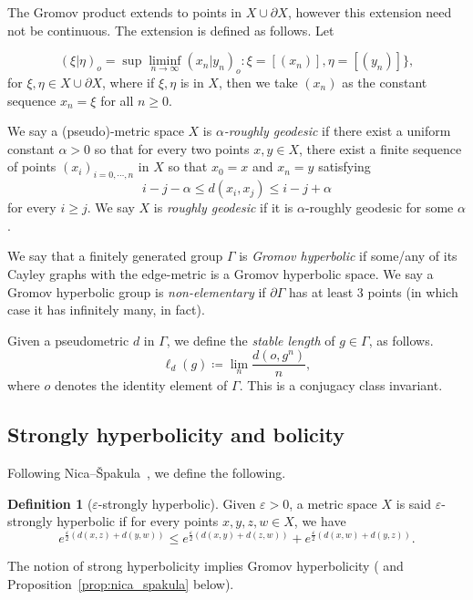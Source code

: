 \documentclass[12pt]{amsart}
\numberwithin{equation}{section}
\numberwithin{figure}{section}
\theoremstyle{definition}
\newtheorem{definition}[equation]{Definition}
\theoremstyle{plain}
\renewcommand{\epsilon}{\varepsilon}
\begin{document}
The Gromov product extends to points in $X \cup \partial X$, however this extension need not be continuous. The extension is defined as follows. Let

\[
(\xi | \eta)_o = \sup \liminf_{n \to \infty} (x_n | y_n)_o \colon \xi = [(x_n)], \eta = [(y_n)]\},
\]
for $\xi, \eta \in X \cup \partial X$, where if $\xi, \eta$ is in $X$, then we take $(x_n)$ as the constant sequence $x_n = \xi$ for all $n \geq 0$.

We say a (pseudo)-metric space $X$ is \emph{$\alpha$-roughly geodesic} if there exist a uniform constant $\alpha>0$ so that for every two points $x,y \in X$, there exist a finite sequence of points $(x_i)_{i=0,\cdots,n}$ in $X$ so that $x_0=x$ and $x_n=y$ satisfying
\[
i-j - \alpha \leq d(x_i,x_j) \leq i-j + \alpha
\]
for every $i \geq j$.
We say $X$ is \emph{roughly geodesic} if it is $\alpha$-roughly geodesic for some $\alpha$.

We say that a finitely generated group $\Gamma$ is \emph{Gromov hyperbolic} if some/any of its Cayley graphs with the edge-metric is a Gromov hyperbolic space.
We say a Gromov hyperbolic group is \emph{non-elementary} if $\partial \Gamma$ has at least 3 points (in which case it has infinitely many, in fact).

Given a pseudometric $d$ in $\Gamma$, we define the \emph{stable length} of $g \in \Gamma$, as follows.
\[
\ell_d(g) \coloneqq \lim_n \frac{d(o,g^n)}{n},
\]
where $o$ denotes the identity element of $\Gamma$. This is a conjugacy class invariant.

\subsection{Strongly hyperbolicity and bolicity}

Following Nica--\v{S}pakula~\cite{NicaSpakula2016}, we define the following.

\begin{definition}[$\epsilon$-strongly hyperbolic]
Given $\epsilon>0$, a metric space $X$ is said $\epsilon$-strongly hyperbolic if for every points $x,y,z,w \in X$, we have
\begin{equation}
e^{\frac{\epsilon}{2}(d(x,z) + d(y,w))} \leq e^{\frac{\epsilon}{2}(d(x,y) + d(z,w))} + e^{\frac{\epsilon}{2}(d(x,w) + d(y,z))}.
\label{eq:strong_hyp_epsilon}
\end{equation}
\label{def:epsilon_stronghyp}
\end{definition}
The notion of strong hyperbolicity implies Gromov hyperbolicity (\cite[Theorem~4.2]{NicaSpakula2016} and Proposition~\ref{prop:nica_spakula} below).
\end{document}
